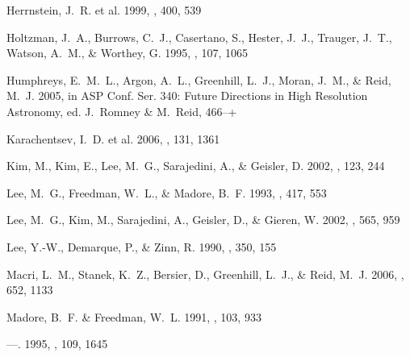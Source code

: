 \documentclass[11pt,preprint2]{aastex}
\begin{document}
\begin{thebibliography}{55}
{Herrnstein}, J.~R. et al. 1999,
  \nat, 400, 539

{Holtzman}, J.~A., {Burrows}, C.~J., {Casertano}, S., {Hester}, J.~J.,
  {Trauger}, J.~T., {Watson}, A.~M., \& {Worthey}, G. 1995, \pasp, 107, 1065

{Humphreys}, E.~M.~L., {Argon}, A.~L., {Greenhill}, L.~J., {Moran}, J.~M., \&
  {Reid}, M.~J. 2005, in ASP Conf. Ser. 340: Future Directions in High
  Resolution Astronomy, ed. J.~{Romney} \& M.~{Reid}, 466--+

{Karachentsev}, I.~D. et al. 2006, \aj, 131, 1361

{Kim}, M., {Kim}, E., {Lee}, M.~G., {Sarajedini}, A., \& {Geisler}, D. 2002,
  \aj, 123, 244

{Lee}, M.~G., {Freedman}, W.~L., \& {Madore}, B.~F. 1993, \apj, 417, 553

{Lee}, M.~G., {Kim}, M., {Sarajedini}, A., {Geisler}, D., \& {Gieren}, W. 2002,
  \apj, 565, 959

{Lee}, Y.-W., {Demarque}, P., \& {Zinn}, R. 1990, \apj, 350, 155

{Macri}, L.~M., {Stanek}, K.~Z., {Bersier}, D., {Greenhill}, L.~J., \& {Reid},
  M.~J. 2006, \apj, 652, 1133

{Madore}, B.~F. \& {Freedman}, W.~L. 1991, \pasp, 103, 933

---. 1995, \aj, 109, 1645


\end{thebibliography}
\end{document}
